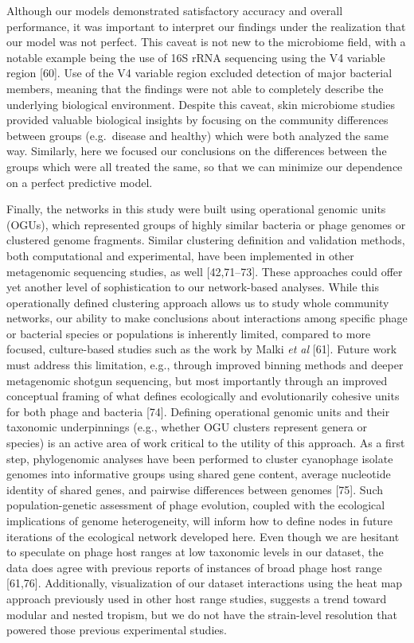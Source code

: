 \documentclass[12pt,]{article}
\begin{document}
Although our models demonstrated satisfactory accuracy and overall
performance, it was important to interpret our findings under the
realization that our model was not perfect. This caveat is not new to
the microbiome field, with a notable example being the use of 16S rRNA
sequencing using the V4 variable region {[}60{]}. Use of the V4 variable
region excluded detection of major bacterial members, meaning that the
findings were not able to completely describe the underlying biological
environment. Despite this caveat, skin microbiome studies provided
valuable biological insights by focusing on the community differences
between groups (e.g.~disease and healthy) which were both analyzed the
same way. Similarly, here we focused our conclusions on the differences
between the groups which were all treated the same, so that we can
minimize our dependence on a perfect predictive model.

Finally, the networks in this study were built using operational genomic
units (OGUs), which represented groups of highly similar bacteria or
phage genomes or clustered genome fragments. Similar clustering
definition and validation methods, both computational and experimental,
have been implemented in other metagenomic sequencing studies, as well
{[}42,71--73{]}. These approaches could offer yet another level of
sophistication to our network-based analyses. While this operationally
defined clustering approach allows us to study whole community networks,
our ability to make conclusions about interactions among specific phage
or bacterial species or populations is inherently limited, compared to
more focused, culture-based studies such as the work by Malki \emph{et
al} {[}61{]}. Future work must address this limitation, e.g., through
improved binning methods and deeper metagenomic shotgun sequencing, but
most importantly through an improved conceptual framing of what defines
ecologically and evolutionarily cohesive units for both phage and
bacteria {[}74{]}. Defining operational genomic units and their
taxonomic underpinnings (e.g., whether OGU clusters represent genera or
species) is an active area of work critical to the utility of this
approach. As a first step, phylogenomic analyses have been performed to
cluster cyanophage isolate genomes into informative groups using shared
gene content, average nucleotide identity of shared genes, and pairwise
differences between genomes {[}75{]}. Such population-genetic assessment
of phage evolution, coupled with the ecological implications of genome
heterogeneity, will inform how to define nodes in future iterations of
the ecological network developed here. Even though we are hesitant to
speculate on phage host ranges at low taxonomic levels in our dataset,
the data does agree with previous reports of instances of broad phage
host range {[}61,76{]}. Additionally, visualization of our dataset
interactions using the heat map approach previously used in other host
range studies, suggests a trend toward modular and nested tropism, but
we do not have the strain-level resolution that powered those previous
experimental studies.
\end{document}
